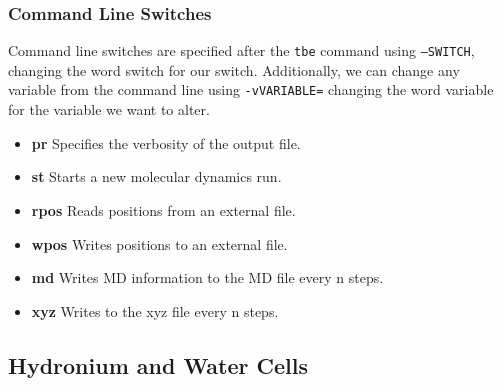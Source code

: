 \documentclass{article}
\begin{document}
\begin{multicols}{2}
\subsubsection{Command Line Switches}
Command line switches are specified after the \texttt{tbe} command using \texttt{--SWITCH}, changing the word switch for our switch. Additionally, we can change any variable from the command line using \texttt{-vVARIABLE=} changing the word variable for the variable we want to alter.
\begin{itemize}
	\item \textbf{pr} Specifies the verbosity of the output file.
	\item \textbf{st} Starts a new molecular dynamics run.
	\item \textbf{rpos} Reads positions from an external file.
	\item \textbf{wpos} Writes positions to an external file.
	\item \textbf{md} Writes MD information to the MD file every n steps.
	\item \textbf{xyz} Writes to the xyz file every n steps.
\end{itemize}

\subsection{Hydronium and Water Cells}

\end{multicols}
\end{document}
